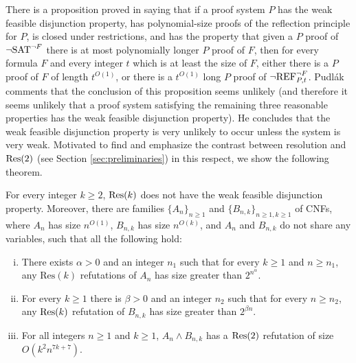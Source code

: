 There is a proposition proved in \cite{Pudlak2003} saying that if a proof system $P$ has the weak feasible disjunction property, has polynomial-size proofs of the reflection principle for $P$, is closed under restrictions, and has the property that given a $P$ proof of $\neg \textnormal{SAT}^{\neg F}$ there is at most polynomially longer $P$ proof of $F$, then for every formula $F$ and every integer $t$ which is at least the size of $F$, either there is a $P$ proof of $F$ of length $t^{O(1)}$, or there is a $t^{O(1)}$ long $P$ proof of $\neg \textnormal{REF}^{\neg F}_{P,t}$. Pudl\'ak comments that the conclusion of this proposition seems unlikely (and therefore it seems unlikely that a proof system satisfying the remaining three reasonable properties has the weak feasible disjunction property). He concludes that the weak feasible disjunction property is very unlikely to occur unless the system is very weak. Motivated to find and emphasize the contrast between resolution and $\textnormal{Res}(2)$ (see Section \ref{sec:preliminaries}) in this respect, we show the following theorem.

\begin{theorem}
\label{thm:res(k)-no-wfdp}
For every integer $k \geq 2$, $\textnormal{Res}(k)$ does not have the weak feasible disjunction property. Moreover, there are families $\{A_n\}_{n \geq 1}$ and $\{B_{n,k}\}_{n \geq 1, k \geq 1}$ of CNFs, where $A_n$ has size $n^{O(1)}$, $B_{n,k}$ has size $n^{O(k)}$, and $A_n$ and  $B_{n,k}$ do not share any variables, such that all the following hold:
\begin{enumerate}[(i)]
\item \label{item:lower_bound_on_A_n} There exists $\alpha > 0$ and an integer $n_1$ such that for every $k \geq 1$ and $n \geq n_1$, any $\text{Res}(k)$ refutations of $A_n$ has size greater than $2^{n^{\alpha}}$.
\item \label{item:lower_bound_on_B_n} For every $k \geq 1$ there is $\beta > 0$ and an integer $n_2$ such that for every $n \geq n_2$, any $\textnormal{Res}(k)$ refutation of $B_{n,k}$ has size greater than $2^{\beta n}$. 
\item \label{item:upper_bound_on_A_n_and_B_n} For all integers $n \geq 1$ and $k \geq 1$, $A_n \land B_{n,k}$ has a $\textnormal{Res}(2)$ refutation of size $O(k^2 n^{7k+7})$.
\end{enumerate}
\end{theorem}

